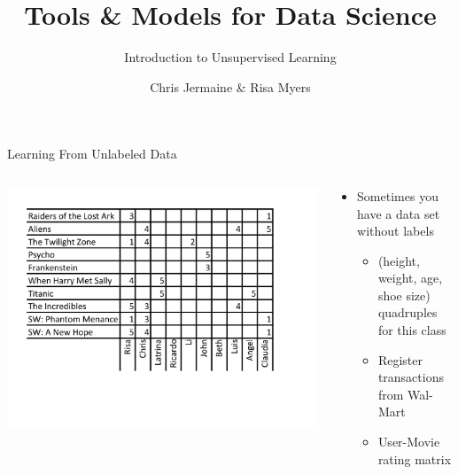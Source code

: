 \documentclass[aspectratio=169]{beamer}
\title[]
{Tools \& Models for Data Science}
\subtitle{Introduction to Unsupervised Learning}
\author[]{Chris Jermaine \& Risa Myers}
\institute
{
  Rice University 
}
\date[]{}
\begin{document}
\begin{frame}
 \titlepage
\end{frame}


\begin{frame}{Learning From Unlabeled Data}

\begin{columns}[T]
\begin{column}{0.5\textwidth}
    \includegraphics[width=1\textwidth]{lectUL/movieGrid} 
\end{column}
\begin{column}{0.5\textwidth}
\begin{itemize}
	\item Sometimes you have a data set without labels
        \begin{itemize}
                \item (height, weight, age, shoe size) quadruples for this class
		\item Register transactions from Wal-Mart
		\item User-Movie rating matrix 
        \end{itemize}
\end{itemize}
\end{column}
\end{columns}

\end{frame}%
\end{document}
